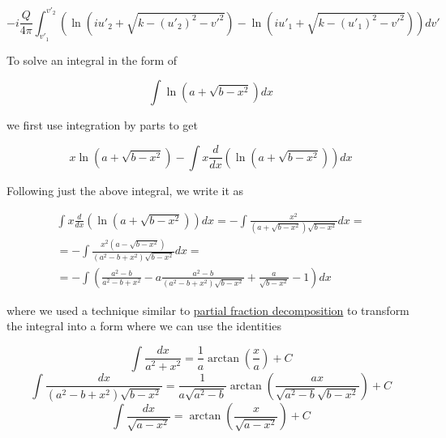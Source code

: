 ﻿\documentclass{article}
\begin{document}
\begin{equation*}
    - i \frac{Q}{4 \pi} \int_{v'_1}^{v'_2} \left( \ln \left( iu'_2 + \sqrt{k - (u'_2)^2 - v'^2} \right) - \ln \left( iu'_1 + \sqrt{k - (u'_1)^2 - v'^2} \right) \right) dv'
\end{equation*}

To solve an integral in the form of

\begin{equation*}
    \int \ln \left( a + \sqrt{b - x^2} \right) dx
\end{equation*}

we first use integration by parts to get

\begin{equation*}
    x \ln \left( a + \sqrt{b - x^2} \right) - \int x \frac{d}{dx} \left( \ln \left( a + \sqrt{b - x^2} \right) \right) dx
\end{equation*}

Following just the above integral, we write it as

\begin{multline*}
    \int x \frac{d}{dx} \left( \ln \left( a + \sqrt{b - x^2} \right) \right) dx = - \int \frac{x^2}{(a + \sqrt{b - x^2}) \sqrt{b - x^2}} dx = \\
    = - \int \frac{x^2 (a - \sqrt{b - x^2})}{(a^2 - b + x^2) \sqrt{b - x^2}} dx = \\
    = - \int \left( \frac{a^2 - b}{a^2 - b + x^2} - a \frac{a^2 - b}{(a^2 - b + x^2) \sqrt{b - x^2}} + \frac{a}{\sqrt{b - x^2}} - 1 \right) dx
\end{multline*}

where we used a technique similar to \href{https://en.wikipedia.org/wiki/Partial_fraction_decomposition}{partial fraction decomposition} to transform the integral into a form where we can use the identities

\begin{equation*}
    \int \frac{dx}{a^2 + x^2} = \frac{1}{a} \arctan \left( \frac{x}{a} \right) + C
\end{equation*}
\begin{equation*}
    \int \frac{dx}{(a^2 - b + x^2) \sqrt{b - x^2}} = \frac{1}{a \sqrt{a^2 - b}} \arctan \left( \frac{ax}{\sqrt{a^2 - b} \sqrt{b - x^2}} \right) + C
\end{equation*}
\begin{equation*}
    \int \frac{dx}{\sqrt{a - x^2}} = \arctan \left( \frac{x}{\sqrt{a - x^2}} \right) + C
\end{equation*}
\end{document}
